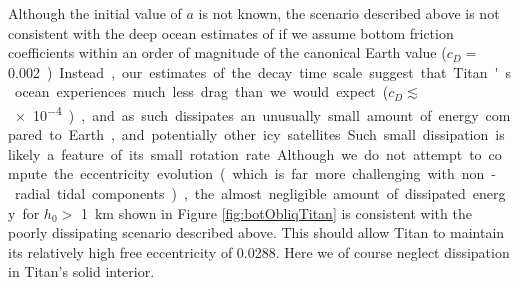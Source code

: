 Although the initial value of $a$ is not known, the scenario described above is not consistent with the deep ocean estimates of \citep{sohl2003interior} if we assume bottom friction coefficients within an order of magnitude of the canonical Earth value ($c_D =$ \SI{0.002}). Instead, our estimates of the decay time scale suggest that Titan's ocean experiences much less drag than we would expect ($c_D \lesssim$ \SI{e-4}), and as such dissipates an unusually small amount of energy compared to Earth, and potentially other icy satellites. Such small dissipation is likely a feature of its small rotation rate.

Although we do not attempt to compute the eccentricity evolution (which is far more challenging with non-radial tidal components), the almost negligible amount of dissipated energy for $h_0 >$ \SI{1}{\kilo\metre} shown in Figure \ref{fig:botObliqTitan} is consistent with the poorly dissipating scenario described above. This should allow Titan to maintain its relatively high free eccentricity of 0.0288. Here we of course neglect dissipation in Titan's solid interior.